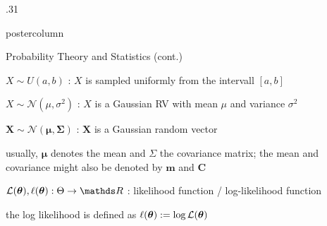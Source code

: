 \documentclass[11pt,compress,t,notes=noshow, xcolor=table]{beamer}
\newlength{\columnheight} %
\begin{document}
\begin{frame}[fragile]{}
\begin{columns}
	\begin{column}{.31\textwidth}
		\begin{beamercolorbox}[center]{postercolumn}
				\begin{minipage}{.98\textwidth}
					\parbox[t][\columnheight]{\textwidth}{
						\begin{myblock}{Probability Theory and Statistics (cont.)}
							\begin{codebox}
								 $X \sim U(a, b)$ : $X$ is sampled uniformly from the intervall $[a, b]$
							\end{codebox}
							\hspace*{1ex}
							\begin{codebox}
								 $X \sim \mathcal{N}(\mu, \sigma^2)$ : $X$ is a Gaussian RV with mean $\mu$ and variance $\sigma^2$
							\end{codebox}
							\hspace*{1ex}
							\begin{codebox}
								 $\bm{X} \sim \mathcal{N}(\bm{\mu}, \bm{\Sigma})$ : $\bm{X}$ is a Gaussian random vector
							\end{codebox}
							\hspace*{1ex} usually, $\bm{\mu}$ denotes the mean and $\Sigma$ the covariance matrix; the mean and covariance might also be denoted by $\bm{m}$ and $\bm{C}$\\
							\begin{codebox}
								 $\mathcal{L}(\thetav), \ell(\thetav): \Theta \to \R$ : likelihood function / log-likelihood function
							\end{codebox}
							\hspace*{1ex} the log likelihood is defined as $\ell(\bm{\theta}) := \log \mathcal{L}(\bm{\theta})$
						\end{myblock}

}
\end{minipage}
\end{beamercolorbox}
\end{column}
\end{columns}
\end{frame}
\end{document}
